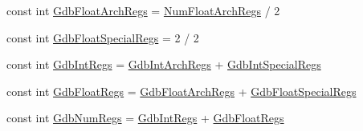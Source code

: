 \begin{DoxyCompactItemize}
$$const int \hyperlink{namespaceMipsISA_a5dec1bb388f2473cc5ae43e313d797eb}{GdbFloatArchRegs} = \hyperlink{namespaceMipsISA_a9ec947def3616ab9415089776195fa09}{NumFloatArchRegs} / 2
\item 
const int \hyperlink{namespaceMipsISA_af8dc5d46886267ca2c0eda8d7ef3acdc}{GdbFloatSpecialRegs} = 2 / 2
\item 
const int \hyperlink{namespaceMipsISA_a10a302d033444fc245bb517d13588869}{GdbIntRegs} = \hyperlink{namespaceMipsISA_a4619f25a19f75050cec7dc07621b0599}{GdbIntArchRegs} + \hyperlink{namespaceMipsISA_a3fdba04e31a7d07d44575f023cd6c344}{GdbIntSpecialRegs}
\item 
const int \hyperlink{namespaceMipsISA_a2cc3ae8e0cc393b8de3b4c2f3677bdd0}{GdbFloatRegs} = \hyperlink{namespaceMipsISA_a5dec1bb388f2473cc5ae43e313d797eb}{GdbFloatArchRegs} + \hyperlink{namespaceMipsISA_af8dc5d46886267ca2c0eda8d7ef3acdc}{GdbFloatSpecialRegs}
\item 
const int \hyperlink{namespaceMipsISA_a23ee23761a1a5c7317b01891fd58e85a}{GdbNumRegs} = \hyperlink{namespaceMipsISA_a10a302d033444fc245bb517d13588869}{GdbIntRegs} + \hyperlink{namespaceMipsISA_a2cc3ae8e0cc393b8de3b4c2f3677bdd0}{GdbFloatRegs}
\end{DoxyCompactItemize}


